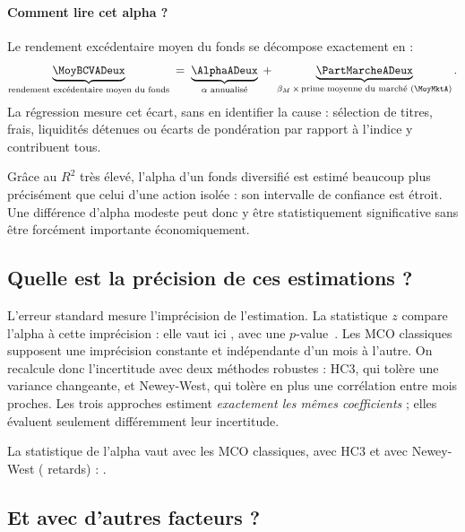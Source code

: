 \documentclass[11pt,a4paper]{article}
\begin{document}
\paragraph{Comment lire cet alpha ?} Le rendement excédentaire moyen du fonds se décompose exactement en :
\[
  \underbrace{\text{\MoyBCVADeux}}_{\text{rendement excédentaire moyen du fonds}}
  \;=\; \underbrace{\text{\AlphaADeux}}_{\alpha \text{ annualisé}}
  \;+\; \underbrace{\text{\PartMarcheADeux}}_{\beta_M \,\times\, \text{prime moyenne du marché (\MoyMktA)}} .
\]
\FondsLecture{} La régression mesure cet écart, sans en identifier la cause : sélection de titres, frais, liquidités détenues ou écarts de pondération par rapport à l'indice y contribuent tous.

Grâce au $R^2$ très élevé, l'alpha d'un fonds diversifié est estimé beaucoup plus précisément que celui d'une action isolée : son intervalle de confiance est étroit. Une différence d'alpha modeste peut donc y être statistiquement significative sans être forcément importante économiquement.

\subsection{Quelle est la précision de ces estimations ?}

L'erreur standard mesure l'imprécision de l'estimation. La statistique $z$ compare l'alpha à cette imprécision : elle vaut ici \AlphaZ{}, avec une \mbox{$p$-value \AlphaPEq}. Les MCO classiques supposent une imprécision constante et indépendante d'un mois à l'autre. On recalcule donc l'incertitude avec deux méthodes robustes : HC3, qui tolère une variance changeante, et Newey-West, qui tolère en plus une corrélation entre mois proches. Les trois approches estiment \emph{exactement les mêmes coefficients} ; elles évaluent seulement différemment leur incertitude.

\begin{table}[h]
  \centering\small
  
  \caption{Modèle de marché du fonds selon la méthode d'inférence. Les méthodes robustes utilisent une approximation par la loi normale.}
\end{table}

La statistique de l'alpha vaut \AlphaTClassique{} avec les MCO classiques, \AlphaZHC{} avec HC3 et \AlphaZ{} avec Newey-West (\NWLags{} retards) : \InferenceConclusion.

\subsection{Et avec d'autres facteurs ?}
\end{document}
